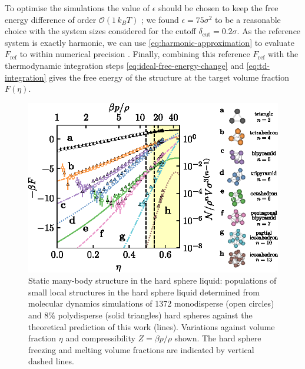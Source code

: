 \documentclass[11pt,twoside]{report}
\begin{document}
To optimise the simulations the value of $\epsilon$ should be chosen to keep the free energy difference of order $\mathcal{O}(1 \, k_B T)$ \cite{SchillingJCP2009}; we found $\epsilon = 75\sigma^2$ to be a reasonable choice with the system sizes considered for the cutoff $\delta_\mathrm{cut} = 0.2\sigma$.
As the reference system is exactly harmonic, we can use \eqref{eq:harmonic-approximation} to evaluate $F_\mathrm{ref}$ to within numerical precision%
.
Finally, combining this reference $F_\mathrm{ref}$ with the thermodynamic integration steps \eqref{eq:ideal-free-energy-change} and \eqref{eq:td-integration} gives the free energy of the structure at the target volume fraction $F(\eta)$.

\begin{figure}
  \includegraphics[width=\linewidth,center]{structure-populations}
  \caption[Concentration of local structures in the equilibrium liquid]{
    Static many-body structure in the hard sphere liquid: populations of small local structures in the hard sphere liquid determined from molecular dynamics simulations of 1372 monodisperse (open circles) and 8\% polydisperse (solid triangles) hard spheres against the theoretical prediction of this work (lines).
    Variations against volume fraction $\eta$ and compressibility $Z = \beta p/\rho$ shown.
    The hard sphere freezing and melting volume fractions are indicated by vertical dashed lines.
  }
  \label{fig:structure-populations}
\end{figure}
\end{document}
